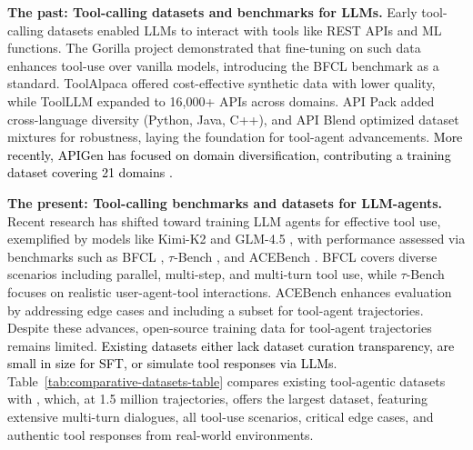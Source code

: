\textbf{The past: Tool-calling datasets and benchmarks for LLMs.}
Early tool-calling datasets enabled LLMs to interact with tools like REST APIs and ML functions. The Gorilla project \citep{patil2023gorillalargelanguagemodel} demonstrated that fine-tuning on such data enhances tool-use over vanilla models, introducing the BFCL benchmark \citep{patil2025bfcl} as a standard. ToolAlpaca \citep{tang_toolalpaca_2023} offered cost-effective synthetic data with lower quality, while ToolLLM \citep{qin2023toolllmfacilitatinglargelanguage} expanded to 16,000+ APIs across domains. API Pack \citep{guo2025apipackmassivemultiprogramming} added cross-language diversity (Python, Java, C++), and API Blend \citep{basu2024apiblendcomprehensivecorporatraining} optimized dataset mixtures for robustness, laying the foundation for tool-agent advancements. \textcolor{black}{More recently, APIGen has focused on domain diversification, contributing a training dataset covering 21 domains \cite{liu2024apigenautomatedpipelinegenerating}.}

\textbf{The present: Tool-calling benchmarks and datasets for LLM-agents.}
Recent research has shifted toward training LLM agents for effective tool use, exemplified by models like Kimi-K2 \citep{kimiteam2025kimik2openagentic} and GLM-4.5 \citep{5team2025glm45agenticreasoningcoding}, with performance assessed via benchmarks such as BFCL \citep{patil2025bfcl}, $\tau$-Bench \citep{yao2024taubenchbenchmarktoolagentuserinteraction}, and ACEBench \citep{chen_acebench_2025}. BFCL covers diverse scenarios including parallel, multi-step, and multi-turn tool use, while $\tau$-Bench focuses on realistic user-agent-tool interactions. ACEBench enhances evaluation by addressing edge cases and including a subset for tool-agent trajectories. Despite these advances, open-source training data for tool-agent trajectories remains limited. \textcolor{black}{Existing datasets \citep{Hermes-Function-Calling-Dataset-V1,liu2025toolacewinningpointsllm,prabhakar2025apigenmtagenticpipelinemultiturn,NemotronPostTrainingDatasetV1} either lack dataset curation transparency, are small in size for SFT, or simulate tool responses via LLMs}. Table~\ref{tab:comparative-datasets-table} compares existing tool-agentic datasets with \datanamen, which, at 1.5 million trajectories, offers the largest dataset, featuring extensive multi-turn dialogues, all tool-use scenarios, critical edge cases, and authentic tool responses from real-world environments.

\newcommand{\cmark}{\textcolor{green}{\ding{51}}}%
\newcommand{\xmark}{\textcolor{red}{\ding{55}}}%


